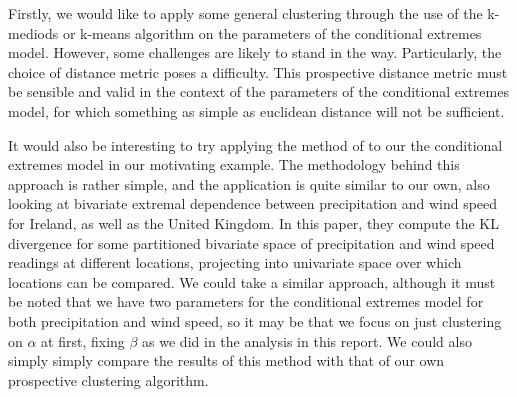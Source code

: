 \documentclass{article}
\numberwithin{equation}{section}
\begin{document}

Firstly, we would like to apply some general clustering through the use of the k-mediods or k-means algorithm on the parameters of the conditional extremes model. 
However, some challenges are likely to stand in the way. 
Particularly, the choice of distance metric poses a difficulty. 
This prospective distance metric must be sensible and valid in the context of the parameters of the conditional extremes model, for which something as simple as euclidean distance will not be sufficient.

It would also be interesting to try applying the method of \citet{Vignotto2021} to our the conditional extremes model in our motivating example. 
The methodology behind this approach is rather simple, and the application is quite similar to our own, also looking at bivariate extremal dependence between precipitation and wind speed for Ireland, as well as the United Kingdom.
In this paper, they compute the KL divergence for some partitioned bivariate space of precipitation and wind speed readings at different locations, projecting into univariate space over which locations can be compared. 
We could take a similar approach, although it must be noted that we have two parameters for the conditional extremes model for both precipitation and wind speed, so it may be that we focus on just clustering on $\alpha$ at first, fixing $\beta$ as we did in the analysis in this report. 
We could also simply simply compare the results of this method with that of our own prospective clustering algorithm.
\end{document}
